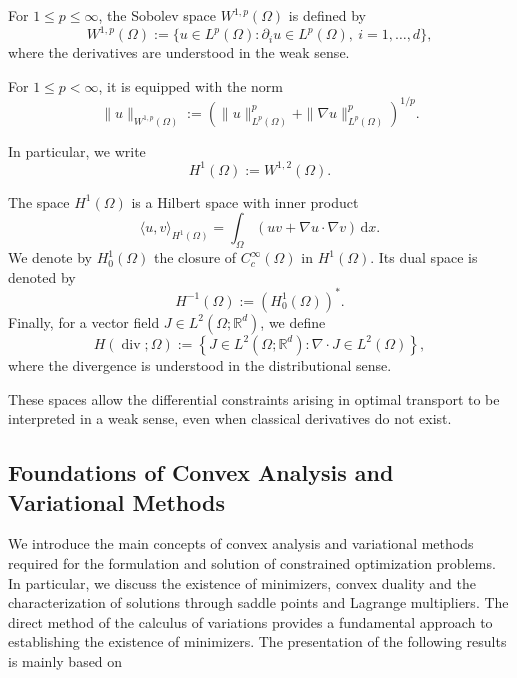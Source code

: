 \begin{definition}
    For $1\leq p\leq\infty$, the Sobolev
    space $W^{1,p}(\Omega)$ is defined by
    \[
        W^{1,p}(\Omega)
        :=\{u\in L^p(\Omega):
        \partial_i u\in L^p(\Omega),
        \ i=1,\ldots,d\},
    \]
    where the derivatives are understood
    in the weak sense.

    For $1\leq p<\infty$, it is equipped
    with the norm
    \[
        \|u\|_{W^{1,p}(\Omega)}
        :=
        \left(
        \|u\|_{L^p(\Omega)}^p+
        \|\nabla u\|_{L^p(\Omega)}^p
        \right)^{1/p}.
    \]

    In particular, we write
    \[
        H^1(\Omega):=W^{1,2}(\Omega).
    \]
\end{definition}

The space $H^1(\Omega)$ is a Hilbert space
with inner product
\[
    \langle u,v\rangle_{H^1(\Omega)}
    =
    \int_\Omega
    \left(uv+\nabla u\cdot\nabla v\right)
    \,\mathrm{d}x.
\]
We denote by $H_0^1(\Omega)$ the closure
of $C_c^\infty(\Omega)$ in $H^1(\Omega)$.
Its dual space is denoted by
\[
    H^{-1}(\Omega):=(H_0^1(\Omega))^*.
\]
Finally, for a vector field
$J\in L^2(\Omega;\mathbb{R}^d)$, we define
\[
    H(\operatorname{div};\Omega)
    :=
    \left\{
        J\in L^2(\Omega;\mathbb{R}^d):
        \nabla\cdot J\in L^2(\Omega)
    \right\},
\]
where the divergence is understood in
the distributional sense.

These spaces allow the differential
constraints arising in optimal transport
to be interpreted in a weak sense, even
when classical derivatives do not exist.


\subsection{Foundations of Convex Analysis and
Variational Methods}
We introduce the main concepts of convex analysis
and variational methods required for the formulation
and solution of constrained optimization problems.
In particular, we discuss the existence of minimizers,
convex duality and the characterization of solutions
through saddle points and Lagrange multipliers.
The direct method of the calculus of variations
provides a fundamental approach to establishing
the existence of minimizers. The presentation of the following results is mainly based on \cite{rockafellar} %

